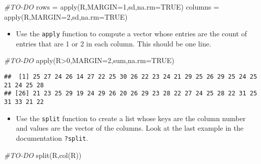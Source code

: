 \documentclass[
]{article}
\newenvironment{Shaded}{\begin{snugshade}}{\end{snugshade}}
\newcommand{\AttributeTok}[1]{\textcolor[rgb]{0.77,0.63,0.00}{#1}}
\newcommand{\CommentTok}[1]{\textcolor[rgb]{0.56,0.35,0.01}{\textit{#1}}}
\newcommand{\ConstantTok}[1]{\textcolor[rgb]{0.00,0.00,0.00}{#1}}
\newcommand{\DecValTok}[1]{\textcolor[rgb]{0.00,0.00,0.81}{#1}}
\newcommand{\FunctionTok}[1]{\textcolor[rgb]{0.00,0.00,0.00}{#1}}
\newcommand{\NormalTok}[1]{#1}
\newcommand{\OtherTok}[1]{\textcolor[rgb]{0.56,0.35,0.01}{#1}}
\newcommand{\SpecialCharTok}[1]{\textcolor[rgb]{0.00,0.00,0.00}{#1}}
\providecommand{\tightlist}{%
  \setlength{\itemsep}{0pt}\setlength{\parskip}{0pt}}
\begin{document}
\begin{Shaded}
\begin{Highlighting}[]
\CommentTok{\#TO{-}DO}
\NormalTok{rows }\OtherTok{=} \FunctionTok{apply}\NormalTok{(R,}\AttributeTok{MARGIN=}\DecValTok{1}\NormalTok{,sd,}\AttributeTok{na.rm=}\ConstantTok{TRUE}\NormalTok{)}
\NormalTok{columns }\OtherTok{=} \FunctionTok{apply}\NormalTok{(R,}\AttributeTok{MARGIN=}\DecValTok{2}\NormalTok{,sd,}\AttributeTok{na.rm=}\ConstantTok{TRUE}\NormalTok{)}
\end{Highlighting}
\end{Shaded}

\begin{itemize}
\tightlist
\item
  Use the \texttt{apply} function to compute a vector whose entries are
  the count of entries that are 1 or 2 in each column. This should be
  one line.
\end{itemize}

\begin{Shaded}
\begin{Highlighting}[]
\CommentTok{\#TO{-}DO}
\FunctionTok{apply}\NormalTok{(R}\SpecialCharTok{\textgreater{}}\DecValTok{0}\NormalTok{,}\AttributeTok{MARGIN=}\DecValTok{2}\NormalTok{,sum,}\AttributeTok{na.rm=}\ConstantTok{TRUE}\NormalTok{)}
\end{Highlighting}
\end{Shaded}

\begin{verbatim}
##  [1] 25 27 24 26 14 27 22 25 30 26 22 23 24 21 29 25 26 29 25 24 25 21 24 25 28
## [26] 21 23 25 29 19 24 29 26 20 26 29 23 28 22 27 24 25 28 22 31 25 31 33 21 22
\end{verbatim}

\begin{itemize}
\tightlist
\item
  Use the \texttt{split} function to create a list whose keys are the
  column number and values are the vector of the columns. Look at the
  last example in the documentation \texttt{?split}.
\end{itemize}

\begin{Shaded}
\begin{Highlighting}[]
\CommentTok{\#TO{-}DO}
\FunctionTok{split}\NormalTok{(R,}\FunctionTok{col}\NormalTok{(R))}
\end{Highlighting}
\end{Shaded}
\end{document}
